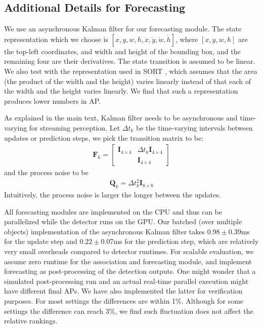 \subsection{Additional Details for Forecasting}
\label{app:forecasting}

We use an asynchronous Kalman filter for our forecasting module. The state representation which we choose is $[x, y, w, h, \dot{x}, \dot{y}, \dot{w}, \dot{h}]$, where $[x, y, w, h]$ are the top-left coordinates, and width and height of the bounding box, and the remaining four are their derivatives. The state transition is assumed to be linear. We also test with the representation used in SORT \cite{Bewley2016_sort}, which assumes that the area (the product of the width and the height) varies linearly instead of that each of the width and the height varies linearly. We find that such a representation produces lower numbers in AP.

As explained in the main text, Kalman filter needs to be asynchronous and time-varying for streaming perception.
Let $\Delta t_k$ be the time-varying intervals between updates or prediction steps, we pick the transition matrix to be:
\begin{align}
\mathbf{F}_k = 
\begin{bmatrix}
\mathbf{I}_{4 \times 4} & \Delta t_k \mathbf{I}_{4 \times 4} \\
& \mathbf{I}_{4 \times 4}
\end{bmatrix}
\end{align}
and the process noise to be
\begin{align}
\mathbf{Q}_k = \Delta t_k^2 \mathbf{I}_{8 \times 8}
\end{align}
Intuitively, the process noise is larger the longer between the updates.

All forecasting modules are implemented on the CPU and thus can be parallelized while the detector runs on the GPU. Our batched (over multiple objects) implementation of the asynchronous Kalman filter takes $0.98 \pm 0.39$ms for the update step and $0.22 \pm 0.07$ms for the prediction step, which are relatively very small overheads compared to detector runtimes. For scalable evaluation, we assume zero runtime for the association and forecasting module, and implement forecasting as post-processing of the detection outputs. One might wonder that a simulated post-processing run and an actual real-time parallel execution might have different final APs. We have also implemented the latter for verification purposes. For most settings the differences are within 1\%. Although for some settings the difference can reach 3\%, we find such fluctuation does not affect the relative rankings.



